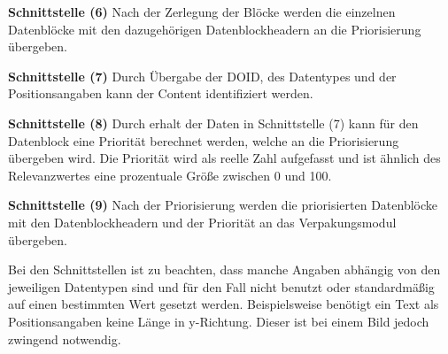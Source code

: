 \textbf{Schnittstelle (6)} \newline
Nach der Zerlegung der Blöcke werden die einzelnen
Datenblöcke mit den dazugehörigen Datenblockheadern an die
Priorisierung übergeben.

\textbf{Schnittstelle (7)} \newline
Durch Übergabe der DOID, des Datentypes und der Positionsangaben kann der
Content identifiziert werden.

\textbf{Schnittstelle (8)} \newline
Durch erhalt der Daten in Schnittstelle (7) kann für
den Datenblock eine Priorität berechnet werden, welche an die Priorisierung übergeben
wird. Die Priorität wird als reelle Zahl aufgefasst und ist ähnlich des
Relevanzwertes eine prozentuale Größe zwischen 0 und 100.

\textbf{Schnittstelle (9)} \newline
Nach der Priorisierung werden die priorisierten Datenblöcke mit den
Datenblockheadern und der Priorität an das Verpakungsmodul übergeben.

Bei den Schnittstellen ist zu beachten, dass manche Angaben abhängig von den
jeweiligen Datentypen sind und für den Fall nicht benutzt oder
standardmäßig auf einen bestimmten Wert gesetzt werden. Beispielsweise benötigt
ein Text als Positionsangaben keine Länge in y-Richtung. Dieser ist bei einem
Bild jedoch zwingend notwendig.
